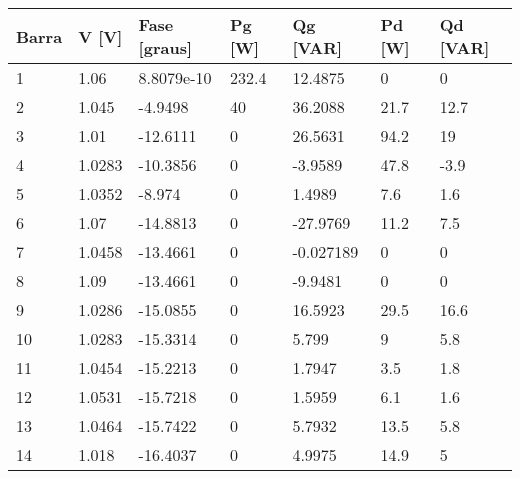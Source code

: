 \begin{tabular}{|l|l|l|l|l|l|l|}
\hline
\textbf{Barra}&\textbf{V [V]}&\textbf{Fase [graus]}&\textbf{Pg [W]}&\textbf{Qg [VAR]}&\textbf{Pd [W]}&\textbf{Qd [VAR]}\\\hline
1&1.06&8.8079e-10&232.4&12.4875&0&0\\\hline
2&1.045&-4.9498&40&36.2088&21.7&12.7\\\hline
3&1.01&-12.6111&0&26.5631&94.2&19\\\hline
4&1.0283&-10.3856&0&-3.9589&47.8&-3.9\\\hline
5&1.0352&-8.974&0&1.4989&7.6&1.6\\\hline
6&1.07&-14.8813&0&-27.9769&11.2&7.5\\\hline
7&1.0458&-13.4661&0&-0.027189&0&0\\\hline
8&1.09&-13.4661&0&-9.9481&0&0\\\hline
9&1.0286&-15.0855&0&16.5923&29.5&16.6\\\hline
10&1.0283&-15.3314&0&5.799&9&5.8\\\hline
11&1.0454&-15.2213&0&1.7947&3.5&1.8\\\hline
12&1.0531&-15.7218&0&1.5959&6.1&1.6\\\hline
13&1.0464&-15.7422&0&5.7932&13.5&5.8\\\hline
14&1.018&-16.4037&0&4.9975&14.9&5\\\hline
\end{tabular}

